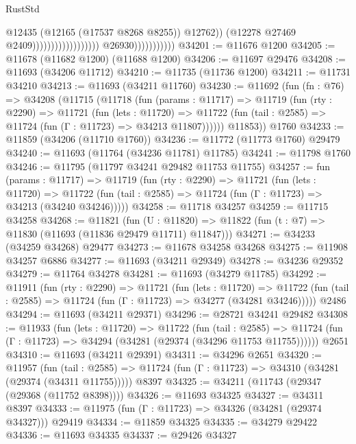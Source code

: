 \begin{lexlean}{RustStd}
\begin{coremodule}
                                                                @12435
                                                                (@12165 (@17537 @8268 @8255))
                                                                @12762))
                                                            (@12278 @27469 @2409))))))))))))))))))
                          @26930)))))))))))
@34201 := @11676 @1200
@34205 := @11678 (@11682 @1200) (@11688 @1200)
@34206 := @11697 @29476
@34208 := @11693 (@34206 @11712)
@34210 := @11735 (@11736 @1200)
@34211 := @11731 @34210
@34213 := @11693 (@34211 @11760)
@34230 := @11692
    (fun (fn : @76) =>
    @34208
      (@11715
        (@11718
          (fun (params : @11717) =>
          @11719
            (fun (rty : @2290) =>
            @11721
              (fun (lets : @11720) =>
              @11722 (fun (tail : @2585) => @11724 (fun (Γ : @11723) => @34213 @11807))))))
        @11853))
    @1760
@34233 := @11859 (@34206 (@11710 @1760))
@34236 := @11772 (@11773 @1760) @29479
@34240 := @11693 (@11764 (@34236 @11781) @11785)
@34241 := @11798 @1760
@34246 := @11795 (@11797 @34241 @29482 @11753 @11755)
@34257 := fun (params : @11717) =>
  @11719
    (fun (rty : @2290) =>
    @11721
      (fun (lets : @11720) =>
      @11722 (fun (tail : @2585) => @11724 (fun (Γ : @11723) => @34213 (@34240 @34246)))))
@34258 := @11718 @34257
@34259 := @11715 @34258
@34268 := @11821
    (fun (U : @11820) => @11822 (fun (t : @7) => @11830 (@11693 (@11836 @29479 @11711) @11847)))
@34271 := @34233 (@34259 @34268) @29477
@34273 := @11678 @34258 @34268
@34275 := @11908 @34257 @6886
@34277 := @11693 (@34211 @29349)
@34278 := @34236 @29352
@34279 := @11764 @34278
@34281 := @11693 (@34279 @11785)
@34292 := @11911
    (fun (rty : @2290) =>
    @11721
      (fun (lets : @11720) =>
      @11722 (fun (tail : @2585) => @11724 (fun (Γ : @11723) => @34277 (@34281 @34246)))))
    @2486
@34294 := @11693 (@34211 @29371)
@34296 := @28721 @34241 @29482
@34308 := @11933
    (fun (lets : @11720) =>
    @11722
      (fun (tail : @2585) =>
      @11724 (fun (Γ : @11723) => @34294 (@34281 (@29374 (@34296 @11753 @11755))))))
    @2651
@34310 := @11693 (@34211 @29391)
@34311 := @34296 @2651
@34320 := @11957
    (fun (tail : @2585) => @11724 (fun (Γ : @11723) => @34310 (@34281 (@29374 (@34311 @11755)))))
    @8397
@34325 := @34211 (@11743 (@29347 (@29368 (@11752 @8398))))
@34326 := @11693 @34325
@34327 := @34311 @8397
@34333 := @11975 (fun (Γ : @11723) => @34326 (@34281 (@29374 @34327))) @29419
@34334 := @11859 @34325
@34335 := @34279 @29422
@34336 := @11693 @34335
@34337 := @29426 @34327

\end{coremodule}
\end{lexlean}
